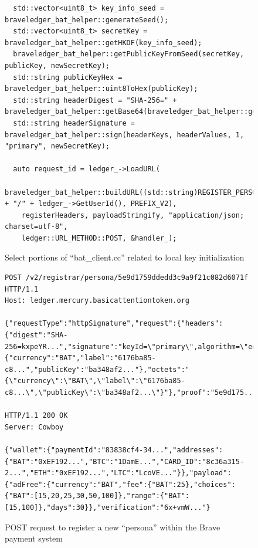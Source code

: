 \documentclass[sigconf]{acmart}
\begin{document}
\begin{figure}
\begin{lstlisting}
  std::vector<uint8_t> key_info_seed = braveledger_bat_helper::generateSeed();
  std::vector<uint8_t> secretKey = braveledger_bat_helper::getHKDF(key_info_seed);
  braveledger_bat_helper::getPublicKeyFromSeed(secretKey, publicKey, newSecretKey);
  std::string publicKeyHex = braveledger_bat_helper::uint8ToHex(publicKey);
  std::string headerDigest = "SHA-256=" + braveledger_bat_helper::getBase64(braveledger_bat_helper::getSHA256(octets));
  std::string headerSignature = braveledger_bat_helper::sign(headerKeys, headerValues, 1, "primary", newSecretKey);

  auto request_id = ledger_->LoadURL(
    braveledger_bat_helper::buildURL((std::string)REGISTER_PERSONA + "/" + ledger_->GetUserId(), PREFIX_V2),
    registerHeaders, payloadStringify, "application/json; charset=utf-8",
    ledger::URL_METHOD::POST, &handler_);
\end{lstlisting}
\caption{Select portions of ``bat\_client.cc'' related to local key initialization}
\label{fig:code_local_wallet_init}
\end{figure}
\begin{figure}
\begin{lstlisting}
POST /v2/registrar/persona/5e9d1759ddedd3c9a9f21c082d6071f HTTP/1.1
Host: ledger.mercury.basicattentiontoken.org

{"requestType":"httpSignature","request":{"headers":{"digest":"SHA-256=kxpeYR...","signature":"keyId=\"primary\",algorithm=\"ed25519\",headers=\"digest\",signature=\"uJzc10...\""},"body":{"currency":"BAT","label":"6176ba85-c8...","publicKey":"ba348af2..."},"octets":"{\"currency\":\"BAT\",\"label\":\"6176ba85-c8...\",\"publicKey\":\"ba348af2...\"}"},"proof":"5e9d175..."}

HTTP/1.1 200 OK
Server: Cowboy

{"wallet":{"paymentId":"83838cf4-34...","addresses":{"BAT":"0xEF192...","BTC":"1DamE...","CARD_ID":"8c36a315-2...","ETH":"0xEF192...","LTC":"LcoVE..."}},"payload":{"adFree":{"currency":"BAT","fee":{"BAT":25},"choices":{"BAT":[15,20,25,30,50,100]},"range":{"BAT":[15,100]},"days":30}},"verification":"6x+vmW..."}
\end{lstlisting}
\caption{POST request to register a new ``persona'' within the Brave payment system}
\label{fig:post_persona}
\end{figure}
\end{document}
